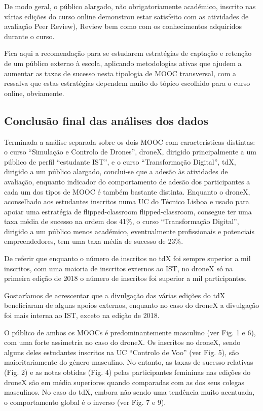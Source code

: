 De modo geral, o público alargado, não obrigatoriamente académico, inscrito nas várias edições do curso online demonstrou estar satisfeito com as atividades de avaliação Peer Review), Review bem como com os conhecimentos adquiridos durante o curso.

Fica aqui a recomendação para se estudarem estratégias de captação e retenção de um público externo à escola, aplicando metodologias ativas que ajudem a aumentar as
taxas de sucesso nesta tipologia de MOOC transversal, com a ressalva que estas estratégias dependem muito do tópico
escolhido para o curso online, obviamente.

\subsection{Conclusão final das análises dos dados}

Terminada a análise separada sobre os dois MOOC com características distintas: o
curso “Simulação e Controlo de Drones”, droneX, dirigido principalmente a um
público de perfil “estudante IST”, e o curso “Transformação Digital”, tdX, dirigido a
um público alargado, conclui-se que a adesão às atividades de avaliação, enquanto
indicador do comportamento de adesão dos participantes a cada um dos tipos de
MOOC é também bastante distinta. Enquanto o droneX, aconselhado aos estudantes inscritos numa UC do Técnico Lisboa e usado para apoiar uma estratégia de flipped-classroom
flipped-classroom, consegue ter uma taxa média de sucesso na ordem dos 41\%, o curso “Transformação Digital”, dirigido a um público menos académico, eventualmente profissionais e potenciais empreendedores, tem uma taxa
média de sucesso de 23\%.

De referir que enquanto o número de inscritos no tdX foi sempre superior a mil inscritos, com uma maioria de inscritos externos ao IST, no droneX só na primeira edição de 2018 o número de inscritos foi superior a mil
participantes. 

Gostaríamos de acrescentar que a divulgação das várias edições do tdX beneficiaram de alguns apoios externos, enquanto no caso do droneX a divulgação foi mais interna ao IST, exceto na edição de 2018.

O público de ambos os MOOCs é predominantemente masculino (ver Fig. 1 e 6), com uma forte assimetria no caso do
droneX. Os inscritos no droneX, sendo alguns deles estudantes inscritos na UC “Controlo de Voo” (ver Fig. 5), são maioritariamente do género masculino. No entanto, as taxas de sucesso relativas (Fig. 2) e as notas obtidas (Fig. 4) pelas participantes femininas nas edições do droneX são em média superiores quando comparadas com as dos seus colegas masculinos. No caso do tdX, embora não sendo uma tendência muito acentuada, o comportamento global é o inverso (ver Fig. 7 e 9).


